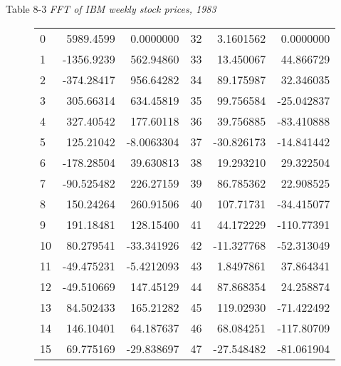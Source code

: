 Table 8-3 \textit{FFT of IBM weekly stock prices, 1983}
\begin{figure}
    \setlength{\tabcolsep}{1em}
    \begin{tabular}{lrrlrr}
         0 &  5989.4599 &  0.0000000 & 32 &  3.1601562 &  0.0000000 \\ 
         1 & -1356.9239 &  562.94860 & 33 &  13.450067 &  44.866729 \\
         2 & -374.28417 &  956.64282 & 34 &  89.175987 &  32.346035 \\
         3 &  305.66314 &  634.45819 & 35 &  99.756584 & -25.042837 \\
         4 &  327.40542 &  177.60118 & 36 &  39.756885 & -83.410888 \\
         5 &  125.21042 & -8.0063304 & 37 & -30.826173 & -14.841442 \\
         6 & -178.28504 &  39.630813 & 38 &  19.293210 &  29.322504 \\
         7 & -90.525482 &  226.27159 & 39 &  86.785362 &  22.908525 \\
         8 &  150.24264 &  260.91506 & 40 &  107.71731 & -34.415077 \\
         9 &  191.18481 &  128.15400 & 41 &  44.172229 & -110.77391 \\
        10 &  80.279541 & -33.341926 & 42 & -11.327768 & -52.313049 \\
        11 & -49.475231 & -5.4212093 & 43 &  1.8497861 &  37.864341 \\
        12 & -49.510669 &  147.45129 & 44 &  87.868354 &  24.258874 \\
        13 &  84.502433 &  165.21282 & 45 &  119.02930 & -71.422492 \\
        14 &  146.10401 &  64.187637 & 46 &  68.084251 & -117.80709 \\
        15 &  69.775169 & -29.838697 & 47 & -27.548482 & -81.061904 \\
        

\end{tabular}
\end{figure}
